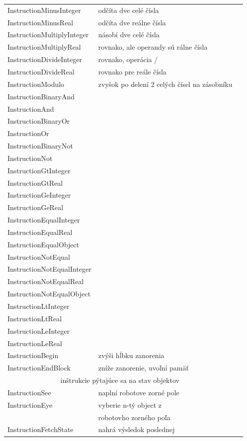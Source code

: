 \begin{center}
\begin{longtable}{|l|l|l|}
InstructionMinusInteger& odčíta dve celé čísla\\
InstructionMinusReal& odčíta dve reálne čísla\\
InstructionMultiplyInteger& násobí dve celé čísla\\
InstructionMultiplyReal& rovnako, ale operandy sú rálne čísla\\
InstructionDivideInteger& rovnako, operácia /\\
InstructionDivideReal& rovnako pre reále čísla\\
InstructionModulo& zvyšok po delení 2 celých čísel na zásobníku\\
InstructionBinaryAnd& \\
InstructionAnd&\\
InstructionBinaryOr&\\
InstructionOr&\\
InstructionBinaryNot&\\
InstructionNot&\\
InstructionGtInteger&\\
InstructionGtReal&\\
InstructionGeInteger&\\
InstructionGeReal&\\
InstructionEqualInteger&\\
InstructionEqualReal&\\
InstructionEqualObject&\\
InstructionNotEqual&\\
InstructionNotEqualInteger&\\
InstructionNotEqualReal&\\
InstructionNotEqualObject&\\
InstructionLtInteger&\\
InstructionLtReal&\\
InstructionLeInteger&\\
InstructionLeReal&\\
InstructionBegin& zvýši hĺbku zanorenia\\
InstructionEndBlock& zníže zanorenie, uvoľní pamäť\\
\hline
\multicolumn{2}{c}{inštrukcie pýtajúce sa na stav objektov}\\
\hline
InstructionSee& naplní robotove zorné pole\\
InstructionEye& vyberie n-tý object z \\
&robotovho zorného poľa\\
InstructionFetchState& nahrá výsledok poslednej \\

\end{longtable}
\end{center}
